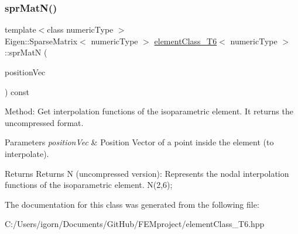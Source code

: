 \subsubsection{\texorpdfstring{spr\+Mat\+N()}{sprMatN()}}
{\footnotesize\ttfamily template$<$class numeric\+Type $>$ \\
Eigen\+::\+Sparse\+Matrix$<$ numeric\+Type $>$ \mbox{\hyperlink{classelement_class___t6}{element\+Class\+\_\+\+T6}}$<$ numeric\+Type $>$\+::spr\+MatN (\begin{DoxyParamCaption}\item[{const Matrix$<$ numeric\+Type, 2, 1 $>$ \&}]{position\+Vec }\end{DoxyParamCaption}) const}

Method\+: Get interpolation functions of the isoparametric element. It returns the uncompressed format. 
\begin{DoxyParams}{Parameters}
{\em position\+Vec} & Position Vector of a point inside the element (to interpolate). \\
\hline
\end{DoxyParams}
\begin{DoxyReturn}{Returns}
Returns N (uncompressed version)\+: Represents the nodal interpolation functions of the isoparametric element. N(2,6); 
\end{DoxyReturn}


The documentation for this class was generated from the following file\+:\begin{DoxyCompactItemize}
\item 
C\+:/\+Users/igorn/\+Documents/\+Git\+Hub/\+F\+E\+Mproject/element\+Class\+\_\+\+T6.\+hpp\end{DoxyCompactItemize}
